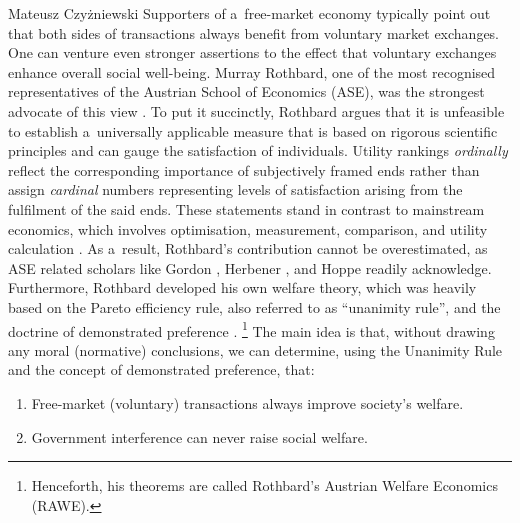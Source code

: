\begin{newrevengenv}{Mateusz Czyżniewski}
Supporters of a~free-market economy typically point out that both sides of transactions always benefit from voluntary market exchanges. One can venture even stronger assertions to the effect that voluntary exchanges enhance overall social well-being. Murray Rothbard, one of the most recognised representatives of the Austrian School of Economics (ASE), was the strongest advocate of this view 
\parencites[][]{rothbard_ethics_1998}[][]{rothbard_toward_2008}[][]{rothbard_man_2009}. %
 To put it succinctly, Rothbard argues that it is unfeasible to establish a~universally applicable measure that is based on rigorous scientific principles and can gauge the satisfaction of individuals. Utility rankings \textit{ordinally} reflect the corresponding importance of subjectively framed ends rather than assign \textit{cardinal} numbers representing levels of satisfaction arising from the fulfilment of the said ends. These statements stand in contrast to mainstream economics, which involves optimisation, measurement, comparison, and utility calculation 
\parencite[][pp.~173--183, 203--256 \mbox{[orig. 1947]}]{samuelson_foundations_1971}. %
 As a~result, Rothbard's contribution cannot be overestimated, as ASE related scholars like Gordon 
\parencite*[][]{gordon_toward_1993}, %
 Herbener 
\parencite*[][]{herbener_pareto_1997}, %
 and Hoppe 
\parencite*[][]{hoppe_economics_2006} %
 readily acknowledge. Furthermore, Rothbard developed his own welfare theory, which was heavily based on the Pareto efficiency rule, also referred to as ``unanimity rule'', and the doctrine of demonstrated preference 
\parencite[][]{rothbard_toward_2008}.%
\footnote{Henceforth, his theorems are called Rothbard's Austrian Welfare Economics (RAWE).} The main idea is that, without drawing any moral (normative) conclusions, we can determine, using the Unanimity Rule and the concept of demonstrated preference, that:



\begin{enumerate}

\item 
Free-market (voluntary) transactions always improve society's welfare.

\item 
Government interference can never raise social welfare.


\end{enumerate}
\end{newrevengenv}
